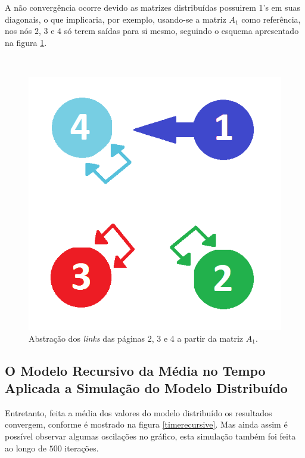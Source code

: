 A não convergência ocorre devido as matrizes distribuídas possuirem 1's em suas diagonais, o que implicaria, por exemplo, usando-se a matriz $A_1$ como referência, nos nós $2$, $3$ e $4$ só terem saídas para si mesmo, seguindo o esquema apresentado na figura \ref{loop}.

\
\begin{figure}[!htb]
	\centering
	\includegraphics[scale=0.4]{imagens/loop}
	\caption{Abstração dos \textit{links} das páginas 2, 3 e 4 a partir da matriz $A_1$.}
	\label{loop}
\end{figure}

\subsection{O Modelo Recursivo da Média no Tempo Aplicada a Simulação do Modelo Distribuído}%

Entretanto, feita a média dos valores do modelo distribuído os resultados convergem, conforme é mostrado na figura \ref{timerecursive}. Mas ainda assim é possível observar algumas oscilações no gráfico, esta simulação também foi feita ao longo de $500$ iterações.

